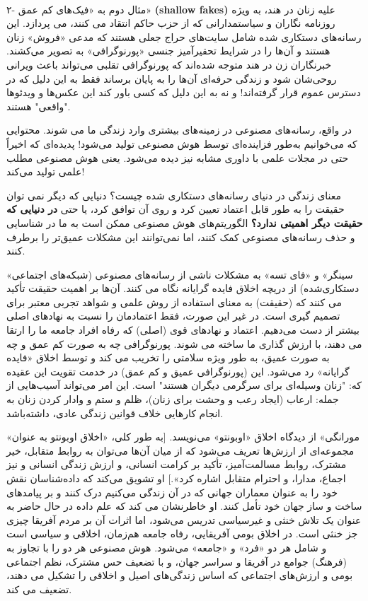\paragraph{}
۲- مثال دوم به «فیک‌های کم عمق» \textenglish{\textbf{(shallow fakes)}} علیه زنان در هند، به ویژه روزنامه نگاران و سیاستمدارانی که از حزب حاکم انتقاد می کنند، می پردازد.
این رسانه‌های دستکاری شده شامل سایت‌های حراج جعلی هستند که مدعی «فروش» زنان هستند و آن‌ها را در شرایط تحقیرآمیز جنسی «پورنوگرافی» به تصویر می‌کشند.
خبرنگاران زن در هند متوجه شده‌اند که پورنوگرافی تقلبی می‌تواند باعث ویرانی روحی‌شان شود و زندگی حرفه‌ای آن‌ها را به پایان برساند فقط به این دلیل که در دسترس عموم قرار گرفته‌اند!
و نه به این دلیل که کسی باور کند این عکس‌ها و ویدئوها "واقعی" هستند.

در واقع، رسانه‌های مصنوعی در زمینه‌های بیشتری وارد زندگی ما می شوند.
محتوایی که می‌خوانیم به‌طور فزاینده‌ای توسط هوش مصنوعی تولید می‌شود!
پدیده‌ای که اخیراً حتی در مجلات علمی با داوری مشابه نیز دیده می‌شود.
یعنی هوش مصنوعی مطلب علمی تولید می‌کند!

معنای زندگی در دنیای رسانه‌های دستکاری شده چیست؟ دنیایی که دیگر نمی توان حقیقت را به طور قابل اعتماد تعیین کرد و روی آن توافق کرد، یا حتی  \textbf{در دنیایی که حقیقت دیگر اهمیتی ندارد؟}
الگوریتم‌های هوش مصنوعی ممکن است به ما در شناسایی و حذف رسانه‌های مصنوعی کمک کنند، اما نمی‌توانند این مشکلات عمیق‌تر را برطرف کنند.

«سینگر» و «فای تسه» به مشکلات ناشی از رسانه‌های مصنوعی (شبکه‌های اجتماعی دستکاری‌شده) از دریچه اخلاق فایده گرایانه نگاه می کنند.
آن‌ها بر اهمیت حقیقت تأکید می کنند که (حقیقت) به معنای استفاده از روش علمی و شواهد تجربی معتبر برای تصمیم گیری است.
در غیر این صورت، فقط اعتمادمان را نسبت به نهاد‌های اصلی بیشتر از دست می‌دهیم.
اعتماد و نهادهای قوی (اصلی) که رفاه افراد جامعه ما را ارتقا می دهند، با ارزش گذاری ما ساخته می شوند.
پورنوگرافی چه به صورت کم عمق و چه به صورت عمیق، به طور ویژه سلامتی را تخریب می کند و توسط اخلاق «فایده گرایانه» رد می‌شود.
این (پورنوگرافی عمیق و کم عمق) در خدمت تقویت این عقیده که: "زنان وسیله‌ای برای سرگرمی دیگران هستند" است.
این امر می‌تواند آسیب‌هایی از جمله: ارعاب (ایجاد رعب و وحشت برای زنان)، ظلم و ستم و وادار کردن زنان به انجام کارهایی خلاف قوانین زندگی عادی، داشته‌باشد.

«مورانگی» از دیدگاه اخلاق «اوبونتو» می‌نویسد.
[به طور کلی، «اخلاق اوبونتو به عنوان مجموعه‌ای از ارزش‌ها تعریف می‌شود که از میان آن‌ها می‌توان به روابط متقابل، خیر مشترک، روابط مسالمت‌آمیز، تأکید بر کرامت انسانی، و ارزش زندگی انسانی و نیز اجماع، مدارا، و احترام متقابل اشاره کرد».]
او تشویق می‌کند که داده‌شناسان نقش خود را به عنوان معماران جهانی که در آن زندگی می‌کنیم درک کنند و بر پیامدهای ساخت و ساز جهان خود تأمل کنند.
او خاطرنشان می کند که علم داده در حال حاضر به عنوان یک تلاش خنثی و غیرسیاسی تدریس می‌شود، اما اثرات آن بر مردم آفریقا چیزی جز خنثی است.
در اخلاق بومی آفریقایی، رفاه جامعه هم‌زمان، اخلاقی و سیاسی است و شامل هر دو «فرد» و «جامعه» می‌شود.
هوش مصنوعی هر دو را با تجاوز به (فرهنگ) جوامع در آفریقا و سراسر جهان، و با تضعیف حس مشترک، نظم اجتماعی بومی و ارزش‌های اجتماعی که اساس زندگی‌های اصیل و اخلاقی را تشکیل می دهند، تضعیف می کند.

